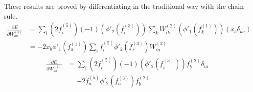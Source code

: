 \documentclass[fleqn]{article}
\begin{document}
These results are proved by differentiating in the traditional way with the chain rule.
\begin{equation}
    \begin{split}
        \frac{\partial E}{\partial W^{(1)}_{ab}} & =
        \sum_i \left ( 2 f^{(5)}_i \right ) \left ( -1 \right ) \left ( \phi'_2 \left ( f^{(3)}_i \right ) \right ) \sum_k W^{(2)}_{ik} \left ( \phi'_1 \left ( f^{(1)}_k \right ) \right ) \left ( x_b \delta_{ka} \right ) \\
        & = - 2 x_b \phi'_1 \left (f^{(1)}_a \right ) \sum_i f^{(5)}_i \phi'_2 \left ( f^{(3)}_i \right ) W^{(2)}_{ia}
    \end{split}
\end{equation}
\begin{equation}
    \begin{split}
        \frac{\partial E}{\partial W^{(2)}_{ab}} & =
        \sum_i \left ( 2 f^{(5)}_i \right ) \left ( -1 \right ) \left ( \phi'_2 \left ( f^{(3)}_i \right ) \right ) f^{(2)}_b \delta_{ia} \\
        & = - 2 f^{(5)}_a \phi'_2 \left ( f^{(3)}_a \right ) f^{(2)}_b
    \end{split}
\end{equation}
\end{document}
